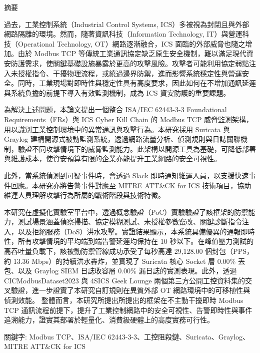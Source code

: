 \thispagestyle{plain}
\begin{center} \begin{huge} 摘要 \end{huge} \end{center}
\noindent
過去，工業控制系統（Industrial Control Systems, ICS）多被視為封閉且與外部網路隔離的環境。然而，隨著資訊科技（Information Technology, IT）與營運科技（Operational Technology, OT）網路逐漸融合，ICS 面臨的外部威脅也隨之增加。由於 Modbus TCP 等傳統工業通訊協定缺乏原生安全機制，難以滿足現代資安防護需求，使關鍵基礎設施暴露於更高的攻擊風險。攻擊者可能利用協定弱點注入未授權指令、干擾物理流程，或繞過邊界防禦，進而影響系統穩定性與營運安全。同時，工業現場對即時性與穩定性具有高度要求，因此如何在不增加通訊延遲與系統負擔的前提下導入有效監測機制，成為 ICS 資安防護的重要課題。

為解決上述問題，本論文提出一個整合 ISA/IEC 62443-3-3 Foundational Requirements（FRs）與 ICS Cyber Kill Chain 的 Modbus TCP 威脅監測架構，用以識別工業控制環境中的異常通訊與攻擊行為。本研究採用 Suricata 與 Graylog 建構開源式被動監測系統，透過網路流量分析、偵測規則與日誌關聯機制，驗證不同攻擊情境下的威脅監測能力。此架構以開源工具為基礎，可降低部署與維護成本，使資安預算有限的企業亦能提升工業網路的安全可視性。

此外，當系統偵測到可疑事件時，會透過 Slack 即時通知維運人員，以支援快速事件回應。本研究亦將告警事件對應至 MITRE ATT\&CK for ICS 技術項目，協助維運人員理解攻擊行為所屬的戰術階段與技術特徵。

本研究在虛擬化實驗室平台中，透過概念驗證（PoC）實驗驗證了該框架的防禦能力，測試場景涵蓋偵察掃描、協定模糊測試、未授權參數竄改、關鍵診斷指令注入，以及拒絕服務（DoS）洪水攻擊。實證結果顯示，本系統具備優異的通報即時性，所有攻擊情境的平均端到端告警延遲均保持在 10 秒以下。在峰值壓力測試的高吞吐量負載下，該被動防禦管線成功承受了每秒高達 29,128.00 個封包（PPS，約 13.36 Mbps）的持續洪水轟炸，並實現了 Suricata 核心 Socket 層 0.00\% 丟包、以及 Graylog SIEM 日誌收容層 0.00\% 漏日誌的實測表現。此外，透過 CICModbusDataset2023 與 4SICS Geek Lounge 兩個第三方公開工控資料集的交叉驗證，進一步證實了本研究自訂規則在異質外部 OT 網路環境中的可移植性與偵測效能。
\newpage
整體而言，本研究所提出所提出的框架在不主動干擾即時 Modbus TCP 通訊流程前提下，提升了工業控制網路中的安全可視性、告警即時性與事件追溯能力，證實其部署於輕量化、消費級硬體上的高度實務可行性。

{關鍵字: Modbus TCP、ISA/IEC 62443-3-3、工控阻殺鏈、Suricata、Graylog、MITRE ATT\&CK for ICS}
\newpage